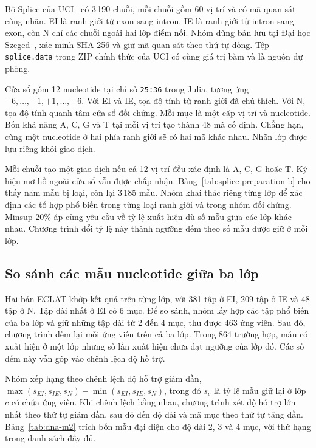 Bộ Splice của UCI~\cite{splice} có 3\,190 chuỗi, mỗi chuỗi gồm
60 vị trí và có mã quan sát cùng nhãn. EI là ranh giới từ exon
sang intron, IE là ranh giới từ intron sang exon, còn N chỉ
các chuỗi ngoài hai lớp điểm nối. Nhóm dùng bản lưu tại Đại
học Szeged~\cite{splice_mirror_b}, xác minh SHA-256 và giữ
mã quan sát theo thứ tự dòng. Tệp \texttt{splice.data} trong
ZIP chính thức của UCI có cùng giá trị băm và là nguồn dự phòng.

Cửa sổ gồm 12 nucleotide tại chỉ số \texttt{25:36} trong Julia,
tương ứng $-6,\ldots,-1,+1,\ldots,+6$. Với EI và IE, tọa độ
tính từ ranh giới đã chú thích. Với N, tọa độ tính quanh tâm
cửa sổ đối chứng. Mỗi mục là một cặp vị trí và nucleotide. Bốn
khả năng A, C, G và T tại mỗi vị trí tạo thành 48 mã cố định.
Chẳng hạn, cùng một nucleotide ở hai phía ranh giới sẽ có hai
mã khác nhau. Nhãn lớp được lưu riêng khỏi giao dịch.

Mỗi chuỗi tạo một giao dịch nếu cả 12 vị trí đều xác định là
A, C, G hoặc T. Ký hiệu mơ hồ ngoài cửa sổ vẫn được chấp nhận.
Bảng~\ref{tab:splice-preparation-b} cho thấy năm mẫu bị loại,
còn lại 3\,185 mẫu.
Nhóm khai thác riêng từng lớp để xác định các tổ hợp phổ biến
trong từng loại ranh giới và trong nhóm đối chứng. Minsup 20\%
áp cùng yêu cầu về tỷ lệ xuất hiện dù số mẫu giữa các lớp khác
nhau. Chương trình đổi tỷ lệ này thành ngưỡng đếm theo số mẫu
được giữ ở mỗi lớp.

\subsection{So sánh các mẫu nucleotide giữa ba lớp}
\begin{table}[!tb]
\centering\small
\caption{Độ hỗ trợ (\%) của bốn mẫu trên EI, IE và N. Hạng tính trong danh sách 463 ứng viên.}
\label{tab:dna-m2}
\TableSplice
\end{table}

Hai bản ECLAT khớp kết quả trên từng lớp, với 381 tập ở EI,
209 tập ở IE và 48 tập ở N. Tập dài nhất ở EI có 6 mục. Để so
sánh, nhóm lấy hợp các tập phổ biến của ba lớp và
giữ những tập dài từ 2 đến 4 mục, thu được 463 ứng viên. Sau đó,
chương trình đếm lại mỗi ứng viên trên cả ba lớp. Trong 864
trường hợp, mẫu có xuất hiện ở một lớp nhưng số lần xuất hiện
chưa đạt ngưỡng của lớp đó. Các số đếm này vẫn góp vào chênh
lệch độ hỗ trợ.

Nhóm xếp hạng theo chênh lệch độ hỗ trợ giảm dần,
$\max(s_{EI},s_{IE},s_N)-\min(s_{EI},s_{IE},s_N)$, trong đó
$s_c$ là tỷ lệ mẫu giữ lại ở lớp $c$ có chứa ứng viên. Khi
chênh lệch bằng nhau, chương trình xét độ hỗ trợ lớn nhất theo
thứ tự giảm dần, sau đó đến độ dài và mã mục theo thứ tự tăng
dần. Bảng~\ref{tab:dna-m2} trích bốn mẫu đại diện cho độ dài
2, 3 và 4 mục, với thứ hạng trong danh sách đầy đủ.

